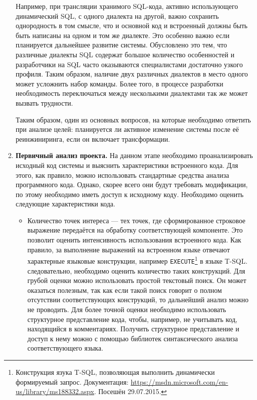 \begin{enumerate}
  Например, при трансляции хранимого SQL-кода, активно использующего динамический SQL, с одного диалекта на другой, важно сохранить однородность в том смысле, что и основной код и встроенный должны быть быть написаны на одном и том же диалекте. Это особенно важно если планируется дальнейшее развитие системы. Обусловлено это тем, что различные диалекты SQL содержат большое количество особенностей и разработчики на SQL часто оказываются специалистами достаточно узкого профиля. Таким образом, наличие двух различных диалектов в место одного может усложнить набор команды. Более того, в процессе разработки необходимость переключаться между несколькими диалектами так же может вызвать трудности.
  
  Таким образом, один из основных вопросов, на которые необходимо ответить при анализе целей: планируется ли активное изменение системы после её реинжиниринга, если он включает трансформации.
  
  \item \textbf{Первичный анализ проекта.} На данном этапе необходимо проанализировать исходный код системы и выяснить характеристики встроенного кода. Для этого, как правило, можно использовать стандартные средства анализа программного кода. Однако, скорее всего они будут требовать модификации, по этому необходимо иметь доступ к исходному коду. Необходимо оценить следующие характеристики кода.
  \begin{itemize}
    \item Количество точек интереса --- тех точек, где сформированное строковое выражение передаётся на обработку соответствующей компоненте. Это позволит оценить интенсивность использования встроенного кода. Как правило, за выполнение выражений на встроенном языке отвечают характерные языковые конструкции, например \verb|EXECUTE|\footnote{Конструкция язука T-SQL, позволяющая выполнить динамически формируемый запрос. Документация: \url{https://msdn.microsoft.com/en-us/library/ms188332.aspx}. Посешён 29.07.2015.} в языке T-SQL. следовательно, необходимо оценить количество таких конструкций. Для грубой оценки можно использовать простой текстовый поиск. Он может оказаться полезным, так как если такой поиск говорит о полном отсутствии соответствующих конструкций, то дальнейший анализ можно не проводить. Для более точной оценки необходимо использовать структурное представление кода, чтобы, например, не учитывать код, находящийся в комментариях. Получить структурное представление и доступ к нему можно с помощью библиотек синтаксического анализа соответствующего языка.
    

\end{itemize}
\end{enumerate}
